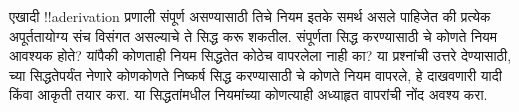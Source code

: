 \documentclass[../../../include/open-logic-section]{subfiles}
\begin{document}
\begin{prob}
एखादी !!a{derivation} प्रणाली संपूर्ण असण्यासाठी तिचे नियम इतके समर्थ
असले पाहिजेत की प्रत्येक अपूर्ततायोग्य संच विसंगत असल्याचे ते सिद्ध करू
शकतील. संपूर्णता सिद्ध करण्यासाठी चे कोणते नियम आवश्यक
होते? यांपैकी कोणताही नियम सिद्धतेत कोठेच वापरलेला नाही का? या प्रश्नांची
उत्तरे देण्यासाठी,  च्या सिद्धतेपर्यंत
नेणारे कोणकोणते निष्कर्ष सिद्ध करण्यासाठी चे कोणते नियम वापरले, हे
दाखवणारी यादी किंवा आकृती तयार करा. या सिद्धतांमधील नियमांच्या कोणत्याही
अध्याहृत वापरांची नोंद अवश्य करा.
\end{prob}
\tagendprob
\end{document}

